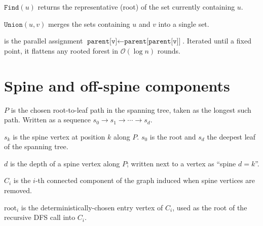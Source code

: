 \begin{ppdefn}
 $\texttt{Find}(u)$ returns the representative (root) of
the set currently containing $u$.
\end{ppdefn}

\begin{ppdefn}
 $\texttt{Union}(u, v)$ merges the sets containing $u$
and $v$ into a single set.
\end{ppdefn}

\begin{ppdefn}
 is the parallel assignment
$\texttt{parent[v]} \leftarrow \texttt{parent[parent[v]]}$.  Iterated
until a fixed point, it flattens any rooted forest in
$\mathcal{O}(\log n)$ rounds.
\end{ppdefn}

\section*{Spine and off-spine components}

\begin{ppdefn}
 $P$ is the chosen root-to-leaf path in the spanning
tree, taken as the longest such path.  Written as a sequence
$s_0 \to s_1 \to \cdots \to s_d$.
\end{ppdefn}

\begin{ppdefn}
 $s_k$ is the spine vertex at position $k$ along
$P$.  $s_0$ is the root and $s_d$ the deepest leaf of the spanning
tree.
\end{ppdefn}

\begin{ppdefn}
 $d$ is the depth of a spine vertex along $P$;
written next to a vertex as ``spine $d{=}k$''.
\end{ppdefn}

\begin{ppdefn}
 $C_i$ is the $i$-th connected component
of the graph induced when spine vertices are removed.
\end{ppdefn}

\begin{ppdefn}
 $\mathrm{root}_i$ is the
deterministically-chosen entry vertex of $C_i$, used as the root of
the recursive DFS call into $C_i$.
\end{ppdefn}

